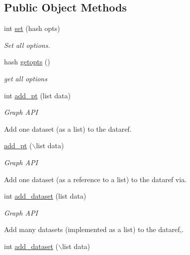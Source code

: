 \subsection*{Public Object Methods}
\label{_amgrpfb74d91261823cc595bbeff1eff2b9d5}
 \begin{DoxyCompactItemize}
\item 
int \hyperlink{classChart_1_1Base_aadd99033eae9eab891cc2abdf7e4b74d}{set} (hash opts)
\begin{DoxyCompactList}\small\item\em Set all options. \item\end{DoxyCompactList}\item 
hash \hyperlink{classChart_1_1Base_a91b33c2a7d570aac658b2660a4d7b809}{getopts} ()
\begin{DoxyCompactList}\small\item\em get all options \item\end{DoxyCompactList}\item 
int \hyperlink{classChart_1_1Base_ac68c2d5654211e9e5c36674324fe0451}{add\_\-pt} (list data)
\begin{DoxyCompactList}\small\item\em Graph API\par
 Add one dataset (as a list) to the dataref. \item\end{DoxyCompactList}\item 
\hyperlink{classChart_1_1Base_a080e4b93239edf6886745c59506c14e5}{add\_\-pt} ($\backslash$list data)
\begin{DoxyCompactList}\small\item\em Graph API\par
 Add one dataset (as a reference to a list) to the dataref via. \item\end{DoxyCompactList}\item 
int \hyperlink{classChart_1_1Base_a43dcf87aa2b9fd362ba104923c3f3d51}{add\_\-dataset} (list data)
\begin{DoxyCompactList}\small\item\em Graph API\par
 Add many datasets (implemented as a list) to the dataref,. \item\end{DoxyCompactList}\item 
int \hyperlink{classChart_1_1Base_aa56e6de915dcdc29d00f66d9326b6503}{add\_\-dataset} ($\backslash$list data)

\end{DoxyCompactItemize}
